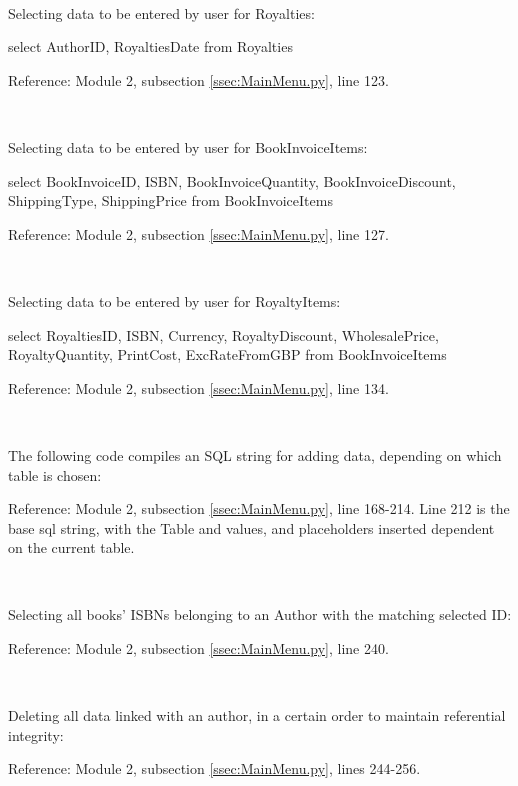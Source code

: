 \

Selecting data to be entered by user for Royalties:
\begin{sql}
select AuthorID, RoyaltiesDate
from Royalties
\end{sql}
Reference: Module 2,  subsection \ref{ssec:MainMenu.py}, line 123.

\

Selecting data to be entered by user for BookInvoiceItems:
\begin{sql}
select BookInvoiceID, ISBN, BookInvoiceQuantity, BookInvoiceDiscount, ShippingType, ShippingPrice
from BookInvoiceItems
\end{sql}
Reference: Module 2,  subsection \ref{ssec:MainMenu.py}, line 127.

\

Selecting data to be entered by user for RoyaltyItems:
\begin{sql}
select RoyaltiesID, ISBN, Currency, RoyaltyDiscount, WholesalePrice, RoyaltyQuantity, PrintCost, ExcRateFromGBP
from BookInvoiceItems
\end{sql}
Reference: Module 2,  subsection \ref{ssec:MainMenu.py}, line 134.

\

The following code compiles an SQL string for adding data, depending on which table is chosen:
\begin{tiny}
\end{tiny}
Reference: Module 2,  subsection \ref{ssec:MainMenu.py}, line 168-214.
Line 212 is the base sql string, with the Table and values, and placeholders inserted dependent on the current table.

\

Selecting all books' ISBNs belonging to an Author with the matching selected ID:
\begin{tiny}
\end{tiny}
Reference: Module 2,  subsection \ref{ssec:MainMenu.py}, line 240.

\

Deleting all data linked with an author, in a certain order to maintain referential integrity:
\begin{tiny}
\end{tiny}
Reference: Module 2,  subsection \ref{ssec:MainMenu.py}, lines 244-256.

